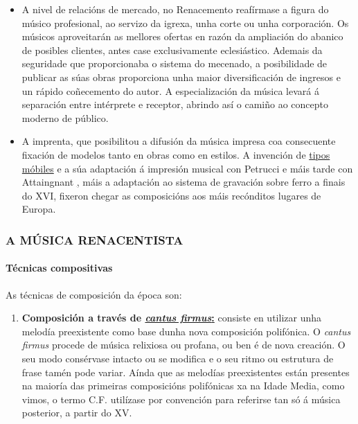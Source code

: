 \documentclass[
]{article}
\begin{document}
\begin{itemize}
\item
  A nivel de relacións de mercado, no Renacemento reafírmase a figura do
  músico profesional, ao servizo da igrexa, unha corte ou unha
  corporación. Os músicos aproveitarán as mellores ofertas en razón da
  ampliación do abanico de posibles clientes, antes case exclusivamente
  eclesiástico. Ademais da seguridade que proporcionaba o sistema do
  mecenado, a posibilidade de publicar as súas obras proporciona unha
  maior diversificación de ingresos e un rápido coñecemento do autor. A
  especialización da música levará á separación entre intérprete e
  receptor, abrindo así o camiño ao concepto moderno de público.
\item
  A imprenta, que posibilitou a difusión da música impresa coa
  consecuente fixación de modelos tanto en obras como en estilos. A
  invención de
  \href{http://en.wikipedia.org/wiki/Sort_\%28typesetting\%29}{tipos
  móbiles} e a súa adaptación á impresión musical con Petrucci e máis
  tarde con Attaingnant
  \href{http://es.wikipedia.org/wiki/Pierre_Attaignant}{,} máis a
  adaptación ao sistema de gravación sobre ferro a finais do XVI,
  fixeron chegar as composicións aos máis recónditos lugares de Europa.
\end{itemize}

\hypertarget{a-muxfasica-renacentista}{%
\subsubsection{A MÚSICA RENACENTISTA}\label{a-muxfasica-renacentista}}

\hypertarget{tuxe9cnicas-compositivas}{%
\paragraph{Técnicas compositivas}\label{tuxe9cnicas-compositivas}}

As técnicas de composición da época son:

\begin{enumerate}
\def\labelenumi{\arabic{enumi}.}
\item
  \textbf{Composición a través de
  \href{http://es.wikipedia.org/wiki/Cantus_firmus}{\emph{cantus
  firmus}:}} consiste en utilizar unha melodía preexistente como base
  dunha nova composición polifónica. O \emph{cantus firmus} procede de
  música relixiosa ou profana, ou ben é de nova creación. O seu modo
  consérvase intacto ou se modifica e o seu ritmo ou estrutura de frase
  tamén pode variar. Aínda que as melodías preexistentes están presentes
  na maioría das primeiras composicións polifónicas xa na Idade Media,
  como vimos, o termo C.F. utilízase por convención para referirse tan
  só á música posterior, a partir do XV.
\end{enumerate}
\end{document}
